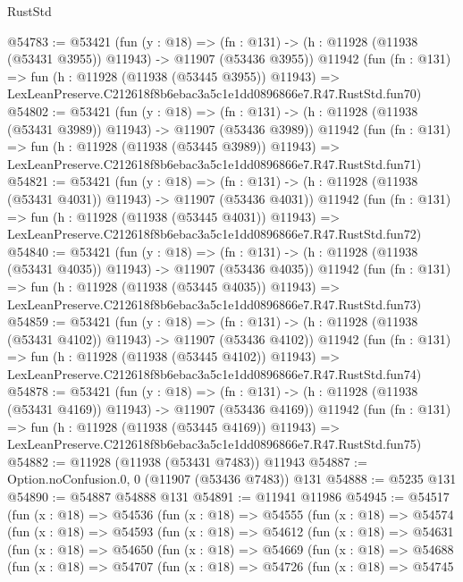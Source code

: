 \begin{lexlean}{RustStd}
\begin{coremodule}
@54783 := @53421
    (fun (y : @18) =>
    (fn : @131) -> (h : @11928 (@11938 (@53431 @3955)) @11943) -> @11907 (@53436 @3955))
    @11942
    (fun (fn : @131) =>
    fun (h : @11928 (@11938 (@53445 @3955)) @11943) =>
    LexLeanPreserve.C212618f8b6ebac3a5c1e1dd0896866e7.R47.RustStd.fun70)
@54802 := @53421
    (fun (y : @18) =>
    (fn : @131) -> (h : @11928 (@11938 (@53431 @3989)) @11943) -> @11907 (@53436 @3989))
    @11942
    (fun (fn : @131) =>
    fun (h : @11928 (@11938 (@53445 @3989)) @11943) =>
    LexLeanPreserve.C212618f8b6ebac3a5c1e1dd0896866e7.R47.RustStd.fun71)
@54821 := @53421
    (fun (y : @18) =>
    (fn : @131) -> (h : @11928 (@11938 (@53431 @4031)) @11943) -> @11907 (@53436 @4031))
    @11942
    (fun (fn : @131) =>
    fun (h : @11928 (@11938 (@53445 @4031)) @11943) =>
    LexLeanPreserve.C212618f8b6ebac3a5c1e1dd0896866e7.R47.RustStd.fun72)
@54840 := @53421
    (fun (y : @18) =>
    (fn : @131) -> (h : @11928 (@11938 (@53431 @4035)) @11943) -> @11907 (@53436 @4035))
    @11942
    (fun (fn : @131) =>
    fun (h : @11928 (@11938 (@53445 @4035)) @11943) =>
    LexLeanPreserve.C212618f8b6ebac3a5c1e1dd0896866e7.R47.RustStd.fun73)
@54859 := @53421
    (fun (y : @18) =>
    (fn : @131) -> (h : @11928 (@11938 (@53431 @4102)) @11943) -> @11907 (@53436 @4102))
    @11942
    (fun (fn : @131) =>
    fun (h : @11928 (@11938 (@53445 @4102)) @11943) =>
    LexLeanPreserve.C212618f8b6ebac3a5c1e1dd0896866e7.R47.RustStd.fun74)
@54878 := @53421
    (fun (y : @18) =>
    (fn : @131) -> (h : @11928 (@11938 (@53431 @4169)) @11943) -> @11907 (@53436 @4169))
    @11942
    (fun (fn : @131) =>
    fun (h : @11928 (@11938 (@53445 @4169)) @11943) =>
    LexLeanPreserve.C212618f8b6ebac3a5c1e1dd0896866e7.R47.RustStd.fun75)
@54882 := @11928 (@11938 (@53431 @7483)) @11943
@54887 := Option.noConfusion.{0, 0} (@11907 (@53436 @7483)) @131
@54888 := @5235 @131
@54890 := @54887 @54888 @131
@54891 := @11941 @11986
@54945 := @54517
    (fun (x : @18) =>
    @54536
      (fun (x : @18) =>
      @54555
        (fun (x : @18) =>
        @54574
          (fun (x : @18) =>
          @54593
            (fun (x : @18) =>
            @54612
              (fun (x : @18) =>
              @54631
                (fun (x : @18) =>
                @54650
                  (fun (x : @18) =>
                  @54669
                    (fun (x : @18) =>
                    @54688
                      (fun (x : @18) =>
                      @54707
                        (fun (x : @18) =>
                        @54726
                          (fun (x : @18) =>
                          @54745

\end{coremodule}
\end{lexlean}
